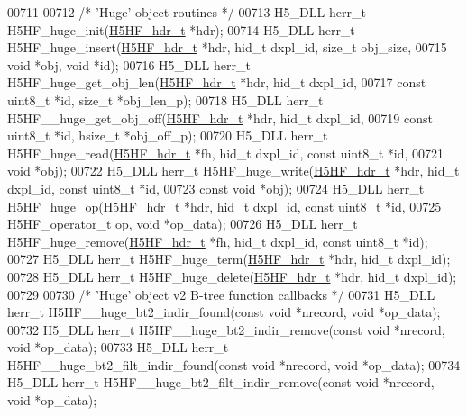 \begin{DoxyCode}
00711 
00712 \textcolor{comment}{/* 'Huge' object routines */}
00713 H5\_DLL herr\_t H5HF\_huge\_init(\hyperlink{struct_h5_h_f__hdr__t}{H5HF\_hdr\_t} *hdr);
00714 H5\_DLL herr\_t H5HF\_huge\_insert(\hyperlink{struct_h5_h_f__hdr__t}{H5HF\_hdr\_t} *hdr, hid\_t dxpl\_id, \textcolor{keywordtype}{size\_t} obj\_size,
00715     \textcolor{keywordtype}{void} *obj, \textcolor{keywordtype}{void} *\textcolor{keywordtype}{id});
00716 H5\_DLL herr\_t H5HF\_huge\_get\_obj\_len(\hyperlink{struct_h5_h_f__hdr__t}{H5HF\_hdr\_t} *hdr, hid\_t dxpl\_id,
00717     \textcolor{keyword}{const} uint8\_t *\textcolor{keywordtype}{id}, \textcolor{keywordtype}{size\_t} *obj\_len\_p);
00718 H5\_DLL herr\_t H5HF\_\_huge\_get\_obj\_off(\hyperlink{struct_h5_h_f__hdr__t}{H5HF\_hdr\_t} *hdr, hid\_t dxpl\_id,
00719     \textcolor{keyword}{const} uint8\_t *\textcolor{keywordtype}{id}, hsize\_t *obj\_off\_p);
00720 H5\_DLL herr\_t H5HF\_huge\_read(\hyperlink{struct_h5_h_f__hdr__t}{H5HF\_hdr\_t} *fh, hid\_t dxpl\_id, \textcolor{keyword}{const} uint8\_t *\textcolor{keywordtype}{id},
00721     \textcolor{keywordtype}{void} *obj);
00722 H5\_DLL herr\_t H5HF\_huge\_write(\hyperlink{struct_h5_h_f__hdr__t}{H5HF\_hdr\_t} *hdr, hid\_t dxpl\_id, \textcolor{keyword}{const} uint8\_t *\textcolor{keywordtype}{id},
00723     \textcolor{keyword}{const} \textcolor{keywordtype}{void} *obj);
00724 H5\_DLL herr\_t H5HF\_huge\_op(\hyperlink{struct_h5_h_f__hdr__t}{H5HF\_hdr\_t} *hdr, hid\_t dxpl\_id, \textcolor{keyword}{const} uint8\_t *\textcolor{keywordtype}{id},
00725     H5HF\_operator\_t op, \textcolor{keywordtype}{void} *op\_data);
00726 H5\_DLL herr\_t H5HF\_huge\_remove(\hyperlink{struct_h5_h_f__hdr__t}{H5HF\_hdr\_t} *fh, hid\_t dxpl\_id, \textcolor{keyword}{const} uint8\_t *\textcolor{keywordtype}{id});
00727 H5\_DLL herr\_t H5HF\_huge\_term(\hyperlink{struct_h5_h_f__hdr__t}{H5HF\_hdr\_t} *hdr, hid\_t dxpl\_id);
00728 H5\_DLL herr\_t H5HF\_huge\_delete(\hyperlink{struct_h5_h_f__hdr__t}{H5HF\_hdr\_t} *hdr, hid\_t dxpl\_id);
00729 
00730 \textcolor{comment}{/* 'Huge' object v2 B-tree function callbacks */}
00731 H5\_DLL herr\_t H5HF\_\_huge\_bt2\_indir\_found(\textcolor{keyword}{const} \textcolor{keywordtype}{void} *nrecord, \textcolor{keywordtype}{void} *op\_data);
00732 H5\_DLL herr\_t H5HF\_\_huge\_bt2\_indir\_remove(\textcolor{keyword}{const} \textcolor{keywordtype}{void} *nrecord, \textcolor{keywordtype}{void} *op\_data);
00733 H5\_DLL herr\_t H5HF\_\_huge\_bt2\_filt\_indir\_found(\textcolor{keyword}{const} \textcolor{keywordtype}{void} *nrecord, \textcolor{keywordtype}{void} *op\_data);
00734 H5\_DLL herr\_t H5HF\_\_huge\_bt2\_filt\_indir\_remove(\textcolor{keyword}{const} \textcolor{keywordtype}{void} *nrecord, \textcolor{keywordtype}{void} *op\_data);

\end{DoxyCode}
